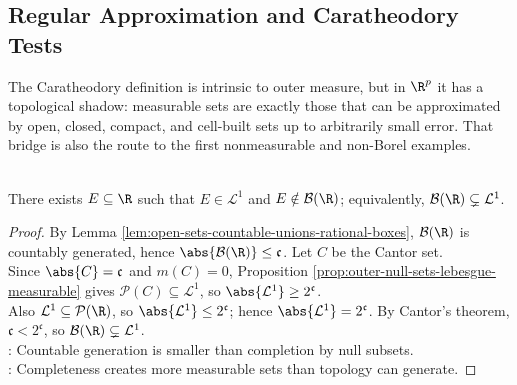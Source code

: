 \subsection{Regular Approximation and Caratheodory Tests}

%

The Caratheodory definition is intrinsic to outer measure, but in $\R^p$ it has a topological shadow: measurable sets are exactly those that can be approximated by open, closed, compact, and cell-built sets up to arbitrarily small error. That bridge is also the route to the first nonmeasurable and non-Borel examples.

\begin{theorem} \label{thm:lebesgue-measurable-non-borel-sets-exist} \\
There exists $E\subseteq\R$ such that $E\in\mathcal{L}^1$ and $E\notin\mathcal{B}(\R)$; equivalently, $\mathcal{B}(\R)\subsetneq\mathcal{L}^1$.
\begin{proof}
By Lemma \ref{lem:open-sets-countable-unions-rational-boxes}, $\mathcal{B}(\R)$ is countably generated, hence $\abs{\mathcal{B}(\R)}\leq\mathfrak{c}$. Let $C$ be the Cantor set.\\
Since $\abs{C}=\mathfrak{c}$ and $m(C)=0$, Proposition \ref{prop:outer-null-sets-lebesgue-measurable} gives $\mathcal{P}(C)\subseteq\mathcal{L}^1$, so $\abs{\mathcal{L}^1}\geq2^{\mathfrak{c}}$.\\
Also $\mathcal{L}^1\subseteq\mathcal{P}(\R)$, so $\abs{\mathcal{L}^1}\leq2^{\mathfrak{c}}$; hence $\abs{\mathcal{L}^1}=2^{\mathfrak{c}}$. By Cantor's theorem, $\mathfrak{c}<2^{\mathfrak{c}}$, so $\mathcal{B}(\R)\subsetneq\mathcal{L}^1$.\\
: Countable generation is smaller than completion by null subsets.\\
: Completeness creates more measurable sets than topology can generate.
\end{proof}
\end{theorem}

